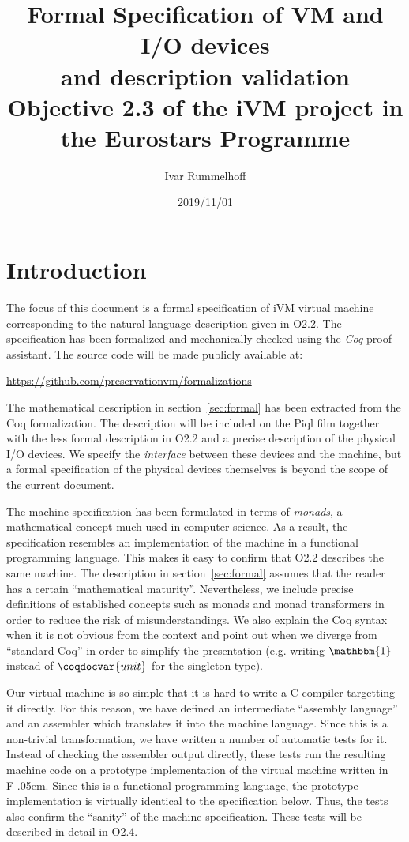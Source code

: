 \documentclass[10pt,a4paper]{article}
\title{%
  Formal Specification of VM and I/O devices\\
  and description validation\\[2ex]
  \large \textbf{Objective 2.3} of the iVM project in the Eurostars Programme
}
\author{Ivar Rummelhoff}
\date{2019/11/01}
\newcommand{\FSharp}{\textsf{F\nolinebreak[4]\kern-.05em\raisebox{.2ex}{\small\#}}\xspace}
\begin{document}
\maketitle

\section{Introduction}

The focus of this document is a formal specification of iVM virtual machine corresponding to the natural language description given in O2.2. The specification has been formalized and mechanically checked using the \emph{Coq} proof assistant. The source code will be made publicly available at:

\begin{center}
  \url{https://github.com/preservationvm/formalizations}
\end{center}

The mathematical description in section~\ref{sec:formal} has been extracted from the Coq formalization. The description will be included on the Piql film together with the less formal description in O2.2 and a precise description of the physical I/O devices. We specify the \emph{interface} between these devices and the machine, but a formal specification of the physical devices themselves is beyond the scope of the current document.

The machine specification has been formulated in terms of \emph{monads}, a mathematical concept much used in computer science. As a result, the specification resembles an implementation of the machine in a functional programming language. This makes it easy to confirm that O2.2 describes the same machine. The description in section~\ref{sec:formal} assumes that the reader has a certain ``mathematical maturity''. Nevertheless, we include precise definitions of established concepts such as monads and monad transformers in order to reduce the risk of misunderstandings. We also explain the Coq syntax when it is not obvious from the context and point out when we diverge from ``standard Coq'' in order to simplify the presentation (e.g. writing $\mathbbm{1}$ instead of $\coqdocvar{unit}$ for the singleton type).

Our virtual machine is so simple that it is hard to write a C compiler targetting it directly. For this reason, we have defined an intermediate ``assembly language'' and an assembler which translates it into the machine language. Since this is a non-trivial transformation, we have written a number of automatic tests for it. Instead of checking the assembler output directly, these tests run the resulting machine code on a prototype implementation of the virtual machine written in \FSharp. Since this is a functional programming language, the prototype implementation is virtually identical to the specification below. Thus, the tests also confirm the ``sanity'' of the machine specification. These tests will be described in detail in O2.4.

\nonstopmode

\end{document}
